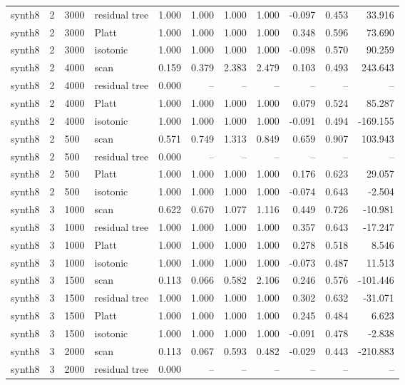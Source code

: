 \begin{tabular}{lrllrrrrrrr}
synth8 & 2 & 3000 & residual tree & 1.000 & 1.000 & 1.000 & 1.000 & -0.097 & 0.453 & 33.916 \\
synth8 & 2 & 3000 & Platt & 1.000 & 1.000 & 1.000 & 1.000 & 0.348 & 0.596 & 73.690 \\
synth8 & 2 & 3000 & isotonic & 1.000 & 1.000 & 1.000 & 1.000 & -0.098 & 0.570 & 90.259 \\
synth8 & 2 & 4000 & scan & 0.159 & 0.379 & 2.383 & 2.479 & 0.103 & 0.493 & 243.643 \\
synth8 & 2 & 4000 & residual tree & 0.000 & -- & -- & -- & -- & -- & -- \\
synth8 & 2 & 4000 & Platt & 1.000 & 1.000 & 1.000 & 1.000 & 0.079 & 0.524 & 85.287 \\
synth8 & 2 & 4000 & isotonic & 1.000 & 1.000 & 1.000 & 1.000 & -0.091 & 0.494 & -169.155 \\
synth8 & 2 & 500 & scan & 0.571 & 0.749 & 1.313 & 0.849 & 0.659 & 0.907 & 103.943 \\
synth8 & 2 & 500 & residual tree & 0.000 & -- & -- & -- & -- & -- & -- \\
synth8 & 2 & 500 & Platt & 1.000 & 1.000 & 1.000 & 1.000 & 0.176 & 0.623 & 29.057 \\
synth8 & 2 & 500 & isotonic & 1.000 & 1.000 & 1.000 & 1.000 & -0.074 & 0.643 & -2.504 \\
synth8 & 3 & 1000 & scan & 0.622 & 0.670 & 1.077 & 1.116 & 0.449 & 0.726 & -10.981 \\
synth8 & 3 & 1000 & residual tree & 1.000 & 1.000 & 1.000 & 1.000 & 0.357 & 0.643 & -17.247 \\
synth8 & 3 & 1000 & Platt & 1.000 & 1.000 & 1.000 & 1.000 & 0.278 & 0.518 & 8.546 \\
synth8 & 3 & 1000 & isotonic & 1.000 & 1.000 & 1.000 & 1.000 & -0.073 & 0.487 & 11.513 \\
synth8 & 3 & 1500 & scan & 0.113 & 0.066 & 0.582 & 2.106 & 0.246 & 0.576 & -101.446 \\
synth8 & 3 & 1500 & residual tree & 1.000 & 1.000 & 1.000 & 1.000 & 0.302 & 0.632 & -31.071 \\
synth8 & 3 & 1500 & Platt & 1.000 & 1.000 & 1.000 & 1.000 & 0.245 & 0.484 & 6.623 \\
synth8 & 3 & 1500 & isotonic & 1.000 & 1.000 & 1.000 & 1.000 & -0.091 & 0.478 & -2.838 \\
synth8 & 3 & 2000 & scan & 0.113 & 0.067 & 0.593 & 0.482 & -0.029 & 0.443 & -210.883 \\
synth8 & 3 & 2000 & residual tree & 0.000 & -- & -- & -- & -- & -- & -- \\

\end{tabular}
